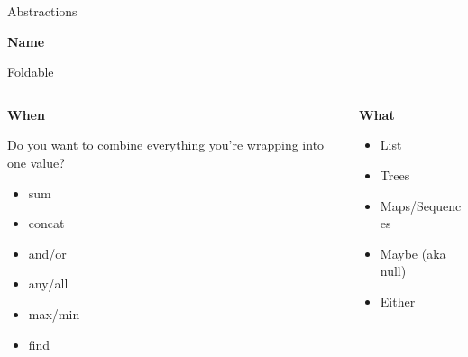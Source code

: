 \documentclass[10pt]{beamer}
\newcommand\myheading[1]{%
  \par\bigskip
  {\Large\bfseries#1}\par\smallskip}
\begin{document}
\begin{frame}[fragile]{Abstractions}
  \myheading{Name}

  Foldable

  \begin{columns}[T]
    \begin{column}{.48\textwidth}
      
      \myheading{When}

      Do you want to combine everything you're wrapping into one value?

      \begin{itemize}
        \item sum
        \item concat
        \item and/or
        \item any/all
        \item max/min
        \item find
      \end{itemize}

    \end{column}

    \begin{column}{.48\textwidth}
      \myheading{What}
      \begin{itemize}
        \item List
        \item Trees
        \item Maps/Sequences
        \item Maybe (aka null)
        \item Either
      \end{itemize}
    \end{column}
    
  \end{columns}
\end{frame}
\end{document}

